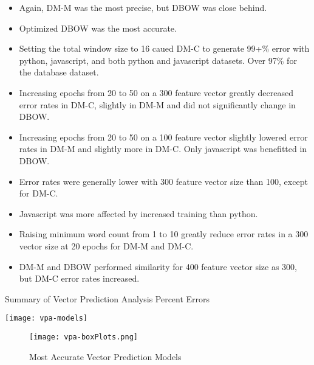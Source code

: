 \begin{itemize}
  \item Again, DM-M was the most precise, but DBOW was close behind.
  \item Optimized DBOW was the most accurate.
  \item Setting the total window size to 16 caued DM-C to generate 99+\% error with python, javascript, and both python and javascript datasets. Over 97\% for the database dataset.
  \item Increasing epochs from 20 to 50 on a 300 feature vector greatly decreased error rates in DM-C, slightly in DM-M and did not significantly change in DBOW. 
  \item Increasing epochs from 20 to 50 on a 100 feature vector slightly lowered error rates in DM-M and slightly more in DM-C. Only javascript was benefitted in DBOW.
  \item Error rates were generally lower with 300 feature vector size than 100, except for DM-C.
  \item Javascript was more affected by increased training than python.
  \item Raising minimum word count from 1 to 10 greatly reduce error rates in a 300 vector size at 20 epochs for DM-M and DM-C.
  \item DM-M and DBOW performed similarity for 400 feature vector size as 300, but DM-C error rates increased.
\end{itemize}

\begin{table}[ht]
\caption{Summary of Vector Prediction Analysis Percent Errors}
\label{vpa-models}
\centering
\texttt{[image: vpa-models]}
\end{table}


\begin{figure}[ht]
\caption{Most Accurate Vector Prediction Models}
\label{vpa-boxPlots}
\centering
\texttt{[image: vpa-boxPlots.png]}
\end{figure}


